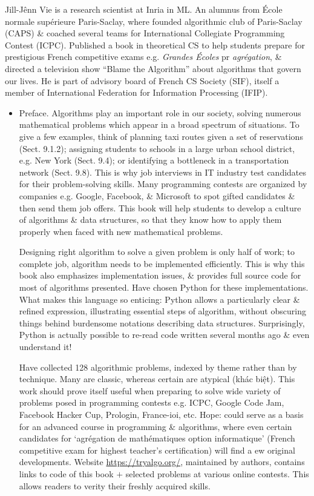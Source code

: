 \documentclass{article}
\begin{document}
{\sc Jill-J\^enn Vie} is a research scientist at Inria in ML. An alumnus from \'Ecole normale sup\'erieure Paris-Saclay, where founded algorithmic club of Paris-Saclay (CAPS) \& coached several teams for International Collegiate Programming Contest (ICPC). Published a book in theoretical CS to help students prepare for prestigious French competitive exams e.g. {\it Grandes \'Ecoles} pr {\it agr\'egation}, \& directed a television show ``Blame the Algorithm'' about algorithms that govern our lives. He is part of advisory board of French CS Society (SIF), itself a member of International Federation for Information Processing (IFIP).
\begin{itemize}
	\item {\sf Preface.} Algorithms play an important role in our society, solving numerous mathematical problems which appear in a broad spectrum of situations. To give a few examples, think of planning taxi routes given a set of reservations (Sect. 9.1.2); assigning students to schools in a large urban school district, e.g. New York (Sect. 9.4); or identifying a bottleneck in a transportation network (Sect. 9.8). This is why job interviews in IT industry test candidates for their problem-solving skills. Many programming contests are organized by companies e.g. Google, Facebook, \& Microsoft to spot gifted candidates \& then send them job offers. This book will help students to develop a culture of algorithms \& data structures, so that they know how to apply them properly when faced with new mathematical problems.
	
	Designing right algorithm to solve a given problem is only half of work; to complete job, algorithm needs to be implemented efficiently. This is why this book also emphasizes implementation issues, \& provides full source code for most of algorithms presented. Have chosen Python for these implementations. What makes this language so enticing: Python allows a particularly clear \& refined expression, illustrating essential steps of algorithm, without obscuring things behind burdensome notations describing data structures. Surprisingly, Python is actually possible to re-read code written several months ago \& even understand it!
	
	Have collected 128 algorithmic problems, indexed by theme rather than by technique. Many are classic, whereas certain are atypical (khác biệt). This work should prove itself useful when preparing to solve wide variety of problems posed in programming contests e.g. ICPC, Google Code Jam, Facebook Hacker Cup, Prologin, France-ioi, etc. Hope: could serve as a basis for an advanced course in programming \& algorithms, where even certain candidates for `agr\'egation de math\'ematiques option informatique' (French competitive exam for highest teacher's certification) will find a ew original developments. Website \url{https://tryalgo.org/}, maintained by authors, contains links to code of this book $+$ selected problems at various online contests. This allows readers to verity their freshly acquired skills.
	

\end{itemize}
\end{document}
